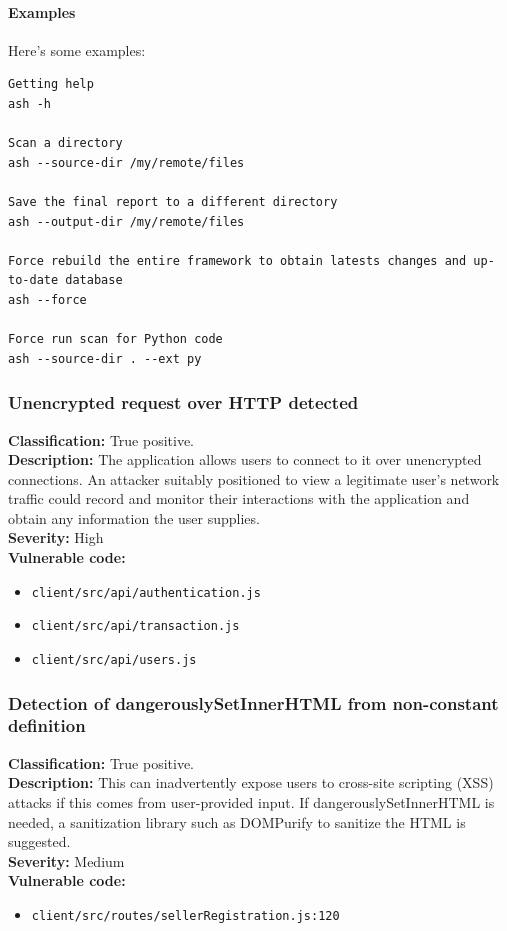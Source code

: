 \documentclass[]{article}
\begin{document}
\paragraph{Examples}
Here's some examples:
\begin{lstlisting}
Getting help
ash -h

Scan a directory
ash --source-dir /my/remote/files

Save the final report to a different directory
ash --output-dir /my/remote/files

Force rebuild the entire framework to obtain latests changes and up-to-date database
ash --force

Force run scan for Python code
ash --source-dir . --ext py
\end{lstlisting}

\subsubsection{Unencrypted request over HTTP detected}
\textbf{Classification:} {True positive.} \\
\textbf{Description:}  The application allows users to connect to it over unencrypted connections. An attacker suitably positioned to view a legitimate user's network traffic could record and monitor their interactions with the application and obtain any information the user supplies. \\ 
\textbf{Severity:}  High \\ 
\textbf{Vulnerable code:}
\begin{itemize}
    \item \texttt{client/src/api/authentication.js}
    \item \texttt{client/src/api/transaction.js}
    \item \texttt{client/src/api/users.js}
\end{itemize}

\subsubsection{Detection of dangerouslySetInnerHTML from non-constant definition}
\textbf{Classification:} {True positive.} \\
\textbf{Description:} This can inadvertently expose users to cross-site scripting (XSS) attacks if this comes from user-provided input. If dangerouslySetInnerHTML is needed, a sanitization library such as DOMPurify to sanitize the HTML is suggested. \\ 
\textbf{Severity:}  Medium \\ 
\textbf{Vulnerable code:}
\begin{itemize}
    \item \texttt{client/src/routes/sellerRegistration.js:120}
\end{itemize}
\end{document}
